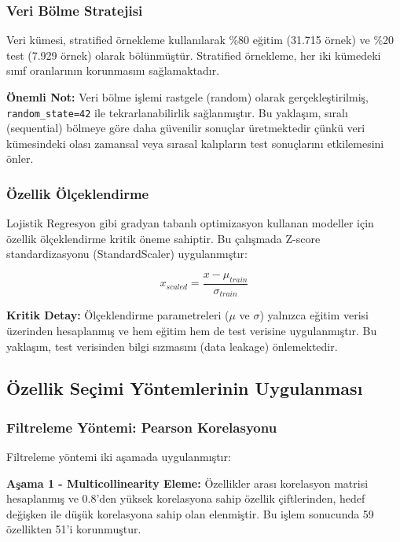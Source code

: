 \documentclass[conference]{IEEEtran}
\begin{document}
\subsubsection{Veri Bölme Stratejisi}

Veri kümesi, stratified örnekleme kullanılarak \%80 eğitim (31.715 örnek) ve \%20 test (7.929 örnek) olarak bölünmüştür. Stratified örnekleme, her iki kümedeki sınıf oranlarının korunmasını sağlamaktadır.

\textbf{Önemli Not:} Veri bölme işlemi rastgele (random) olarak gerçekleştirilmiş, \texttt{random\_state=42} ile tekrarlanabilirlik sağlanmıştır. Bu yaklaşım, sıralı (sequential) bölmeye göre daha güvenilir sonuçlar üretmektedir çünkü veri kümesindeki olası zamansal veya sırasal kalıpların test sonuçlarını etkilemesini önler.

\subsubsection{Özellik Ölçeklendirme}

Lojistik Regresyon gibi gradyan tabanlı optimizasyon kullanan modeller için özellik ölçeklendirme kritik öneme sahiptir. Bu çalışmada Z-score standardizasyonu (StandardScaler) uygulanmıştır:

\begin{equation}
    x_{scaled} = \frac{x - \mu_{train}}{\sigma_{train}}
\end{equation}

\textbf{Kritik Detay:} Ölçeklendirme parametreleri ($\mu$ ve $\sigma$) yalnızca eğitim verisi üzerinden hesaplanmış ve hem eğitim hem de test verisine uygulanmıştır. Bu yaklaşım, test verisinden bilgi sızmasını (data leakage) önlemektedir.

\subsection{Özellik Seçimi Yöntemlerinin Uygulanması}

\subsubsection{Filtreleme Yöntemi: Pearson Korelasyonu}

Filtreleme yöntemi iki aşamada uygulanmıştır:

\textbf{Aşama 1 - Multicollinearity Eleme:} Özellikler arası korelasyon matrisi hesaplanmış ve 0.8'den yüksek korelasyona sahip özellik çiftlerinden, hedef değişken ile düşük korelasyona sahip olan elenmiştir. Bu işlem sonucunda 59 özellikten 51'i korunmuştur.
\end{document}
